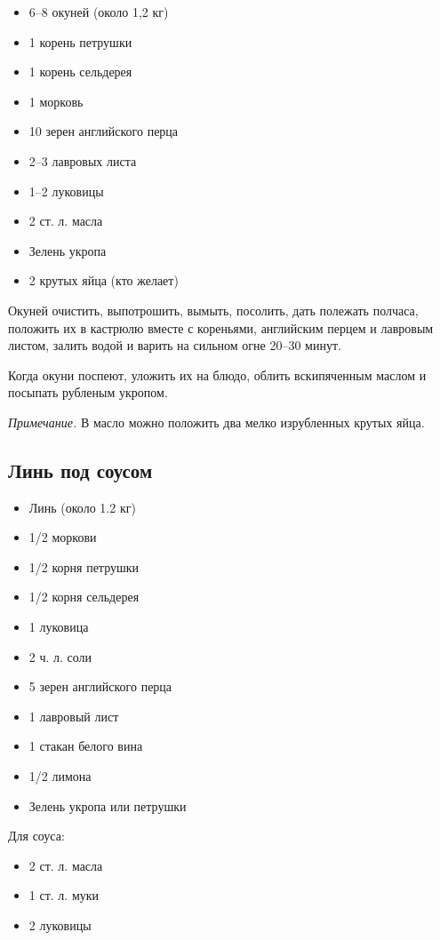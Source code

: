 \begin{itemize}
	\item 6–8 окуней (около 1,2 кг)
    \item 1 корень петрушки
    \item 1 корень сельдерея 
    \item 1 морковь 
    \item 10 зерен английского перца
    \item 2–3 лавровых листа
    \item 1–2 луковицы
    \item 2 ст. л. масла
    \item Зелень укропа 
    \item 2 крутых яйца (кто желает)
\end{itemize}

Окуней очистить, выпотрошить, вымыть, посолить, дать полежать полчаса, положить их в кастрюлю вместе с кореньями, английским перцем и лавровым листом, залить водой и варить на сильном огне 20–30 минут.

Когда окуни поспеют, уложить их на блюдо, облить вскипяченным маслом и посыпать рубленым укропом.

\emph{Примечание.} В масло можно положить два мелко изрубленных крутых яйца.

\subsection{Линь под соусом}

\begin{itemize}
	\item Линь (около 1.2 кг)
    \item 1/2 моркови 
    \item 1/2 корня петрушки
    \item 1/2 корня сельдерея
    \item 1 луковица
    \item 2 ч. л. соли 
    \item 5 зерен английского перца
    \item 1 лавровый лист
    \item 1 стакан белого вина 
    \item 1/2 лимона 
    \item Зелень укропа или петрушки
\end{itemize}

Для соуса: 

\begin{itemize}
	\item 2 ст. л. масла
    \item 1 ст. л. муки
    \item 2 луковицы
\end{itemize}

